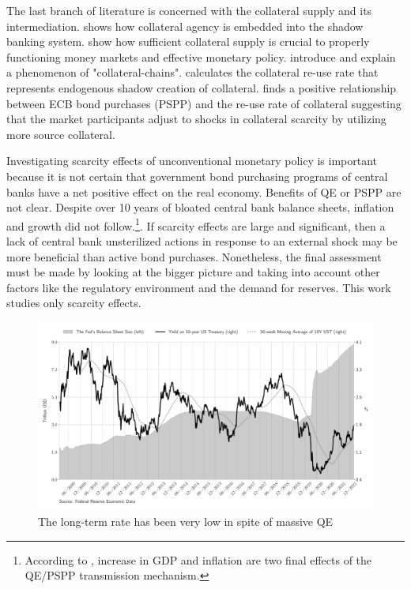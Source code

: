 \documentclass[11pt,a4paper,english,oneside]{article}
\begin{document}
The last branch of literature is concerned with the collateral supply and its intermediation. \citet{singh2011} shows how collateral agency is embedded into the shadow banking system. \citet{sissoko2020} show how sufficient collateral supply is crucial to properly functioning money markets and effective monetary policy. \citet{singh2012} introduce and explain a phenomenon of "collateral-chains". \citet{singh2017} calculates the collateral re-use rate that represents endogenous shadow creation of collateral. \citet{jank2021} finds a positive relationship between ECB bond purchases (PSPP) and the re-use rate of collateral suggesting that the market participants adjust to shocks in collateral scarcity by utilizing more source collateral.

Investigating scarcity effects of unconventional monetary policy is important because it is not certain that government bond purchasing programs of central banks have a net positive effect on the real economy. Benefits of QE or PSPP are not clear. Despite over 10 years of bloated central bank balance sheets, inflation and growth did not follow.\footnote{According to \citet{gern2015}, increase in GDP and inflation are two final effects of the QE/PSPP transmission mechanism.}. If scarcity effects are large and significant, then a lack of central bank unsterilized actions in response to an external shock may be more beneficial than active bond purchases. Nonetheless, the final assessment must be made by looking at the bigger picture and taking into account other factors like the regulatory environment and the demand for reserves. This work studies only scarcity effects.

\begin{figure}[htb!]
  \begin{center}
    \caption{The long-term rate has been very low in spite of massive QE}
    \label{Feds_BS}
    \includegraphics[width=0.99\linewidth]{fed_bs.pdf}
  \end{center}
\end{figure}
\end{document}

